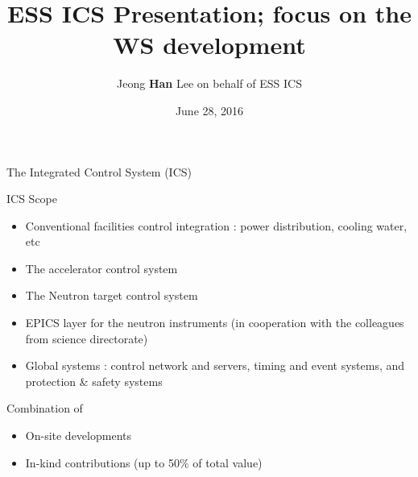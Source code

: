\documentclass[
  9pt
  , table
  , ignorenonframetext
]{beamer}
\title{ESS ICS Presentation; focus on the WS development}
\author{Jeong \textbf{Han} Lee on behalf of ESS ICS}%
\institute{
  Integrated Control System Division\\
  \textbf{ESS}, Sweden
}
\date{June 28, 2016}
\begin{document}
 
\begin{frame}[plain]
  \titlepage
\end{frame}


\begin{frame}{The Integrated Control System (ICS)}
  \begin{block}{ICS Scope}
    \begin{itemize}
    \item Conventional facilities control integration : power distribution, cooling water, etc
    \item The accelerator control system
    \item The Neutron target control system
    \item EPICS layer for the neutron instruments (in cooperation with the colleagues from science directorate)
    \item Global systems : control network and servers, timing and event systems, and protection \& safety systems
    \end{itemize}
  \end{block}
  \begin{exampleblock}{Combination of}
    \begin{itemize}
    \item On-site developments 
    \item In-kind contributions (up to 50\% of total value)
    \end{itemize}
  \end{exampleblock}
\end{frame}
\end{document}
